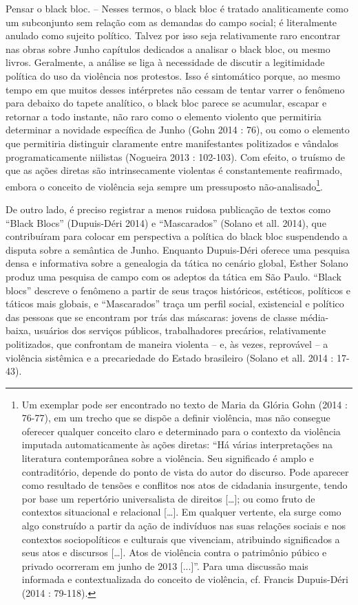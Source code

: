 Pensar o black bloc. -- Nesses termos, o black bloc é tratado
analiticamente como um subconjunto sem relação com as demandas do campo
social; é literalmente anulado como sujeito político. Talvez por isso
seja relativamente raro encontrar nas obras sobre Junho capítulos
dedicados a analisar o black bloc, ou mesmo livros. Geralmente, a
análise se liga à necessidade de discutir a legitimidade política do uso
da violência nos protestos. Isso é sintomático porque, ao mesmo tempo em
que muitos desses intérpretes não cessam de tentar varrer o fenômeno
para debaixo do tapete analítico, o black bloc parece se acumular,
escapar e retornar a todo instante, não raro como o elemento violento
que permitiria determinar a novidade específica de Junho (Gohn 2014 :
76), ou como o elemento que permitiria distinguir claramente entre
manifestantes politizados e vândalos programaticamente niilistas
(Nogueira 2013 : 102-103). Com efeito, o truísmo de que as ações diretas
são intrinsecamente violentas é constantemente reafirmado, embora o
conceito de violência seja sempre um pressuposto não-analisado\footnote{Um
  exemplar pode ser encontrado no texto de Maria da Glória Gohn (2014 :
  76-77), em um trecho que se dispõe a definir violência, mas não
  consegue oferecer qualquer conceito claro e determinado para o
  contexto da violência imputada automaticamente às ações diretas: ``Há
  várias interpretações na literatura contemporânea sobre a violência.
  Seu significado é amplo e contraditório, depende do ponto de vista do
  autor do discurso. Pode aparecer como resultado de tensões e conflitos
  nos atos de cidadania insurgente, tendo por base um repertório
  universalista de direitos {[}\ldots{}{]}; ou como fruto de contextos
  situacional e relacional {[}\ldots{}{]}. Em qualquer vertente, ela
  surge como algo construído a partir da ação de indivíduos nas suas
  relações sociais e nos contextos sociopolíticos e culturais que
  vivenciam, atribuindo significados a seus atos e discursos
  {[}\ldots{}{]}. Atos de violência contra o patrimônio púbico e privado
  ocorreram em junho de 2013 {[}...{]}''. Para uma discussão mais
  informada e contextualizada do conceito de violência, cf. Francis
  Dupuis-Déri (2014 : 79-118).}.

De outro lado, é preciso registrar a menos ruidosa publicação de textos
como ``Black Blocs'' (Dupuis-Déri 2014) e ``Mascarados'' (Solano et all.
2014), que contribuíram para colocar em perspectiva a política do black
bloc suspendendo a disputa sobre a semântica de Junho. Enquanto
Dupuis-Déri oferece uma pesquisa densa e informativa sobre a genealogia
da tática no cenário global, Esther Solano produz uma pesquisa de campo
com os adeptos da tática em São Paulo. ``Black blocs'' descreve o
fenômeno a partir de seus traços históricos, estéticos, políticos e
táticos mais globais, e ``Mascarados'' traça um perfil social,
existencial e político das pessoas que se encontram por trás das
máscaras: jovens de classe média-baixa, usuários dos serviços públicos,
trabalhadores precários, relativamente politizados, que confrontam de
maneira violenta -- e, às vezes, reprovável -- a violência sistêmica e a
precariedade do Estado brasileiro (Solano et all. 2014 : 17-43).

